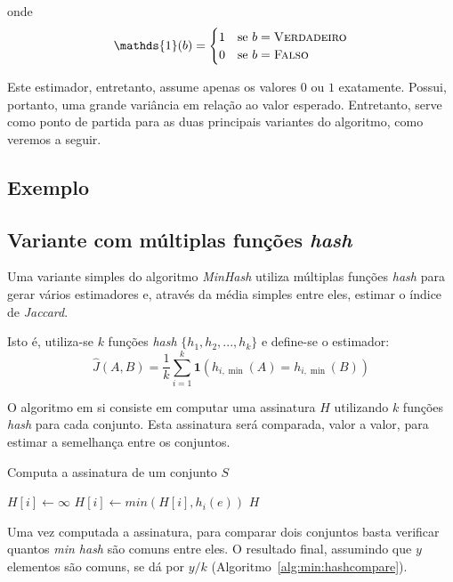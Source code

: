 onde
\[
\mathds{1}(b) = \begin{cases} 
    1 & \text{se}\ b = \textsc{Verdadeiro} \\
    0 & \text{se}\ b = \textsc{Falso} \\
\end{cases}
\]

Este estimador, entretanto, assume apenas os valores $0$ ou $1$ exatamente. Possui, portanto, uma grande variância em relação ao valor esperado. Entretanto, serve como ponto de partida para as duas principais variantes do algoritmo, como veremos a seguir.

\subsection{Exemplo}\label{sec:minhash:example}


\subsection{Variante com múltiplas funções \emph{hash}}

Uma variante simples do algoritmo \emph{MinHash} utiliza múltiplas funções \emph{hash} para gerar vários estimadores e, através da média simples entre eles, estimar o índice de \emph{Jaccard}. 

Isto é, utiliza-se $k$ funções \emph{hash} $\{h_1, h_2, ... ,h_k\}$ e define-se o estimador:
\[
\hat{J}(A, B) = \frac{1}{k} \sum\limits_{i=1}^{k} \textbf{1}(h_{i,\min}(A) = h_{i,\min}(B))
\]

O algoritmo em si consiste em computar uma assinatura $H$ utilizando $k$ funções \emph{hash} para cada conjunto. Esta assinatura será comparada, valor a valor, para estimar a semelhança entre os conjuntos.

\begin{algorithm}
\linespread{1}\selectfont
\caption{Computa a assinatura de um conjunto $S$}
\label{alg:min:hashcompute}
\begin{algorithmic}[1]
        \State $H[i] \gets \infty$
            \State $H[i] \gets min(H[i], h_i(e))$
	    \EndFor
	\EndFor
	\Return $H$
\EndFunction
\end{algorithmic}
\end{algorithm}

Uma vez computada a assinatura, para comparar dois conjuntos basta verificar quantos \emph{min hash} são comuns entre eles. O resultado final, assumindo que $y$ elementos são comuns, se dá por $y/k$ (Algoritmo~\ref{alg:min:hashcompare}).

